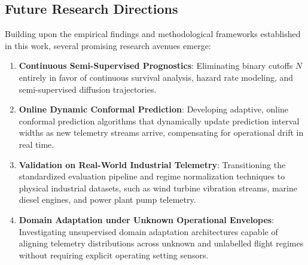 \subsection{Future Research Directions}
Building upon the empirical findings and methodological frameworks established in this work, several promising research avenues emerge:
\begin{enumerate}
    \item \textbf{Continuous Semi-Supervised Prognostics}: Eliminating binary cutoffs $N$ entirely in favor of continuous survival analysis, hazard rate modeling, and semi-supervised diffusion trajectories.
    \item \textbf{Online Dynamic Conformal Prediction}: Developing adaptive, online conformal prediction algorithms that dynamically update prediction interval widths as new telemetry streams arrive, compensating for operational drift in real time.
    \item \textbf{Validation on Real-World Industrial Telemetry}: Transitioning the standardized evaluation pipeline and regime normalization techniques to physical industrial datasets, such as wind turbine vibration streams, marine diesel engines, and power plant pump telemetry.
    \item \textbf{Domain Adaptation under Unknown Operational Envelopes}: Investigating unsupervised domain adaptation architectures capable of aligning telemetry distributions across unknown and unlabelled flight regimes without requiring explicit operating setting sensors.
\end{enumerate}
